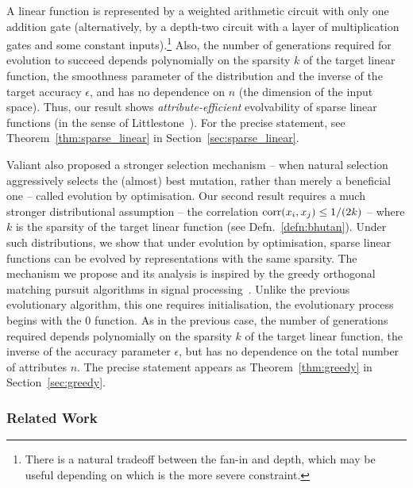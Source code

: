 A linear function is represented by a weighted arithmetic circuit with only one
addition gate (alternatively, by a depth-two circuit with a layer of
multiplication gates and some constant inputs).\footnote{There is a natural
tradeoff between the fan-in and depth, which may be useful depending on which is
the more severe constraint.} Also, the number of generations required for
evolution to succeed depends polynomially on the sparsity $k$ of the target
linear function, the smoothness parameter of the distribution and the inverse of
the target accuracy $\epsilon$, and has no dependence on $n$ (the dimension of
the input space). Thus, our result shows \emph{attribute-efficient} evolvability
of sparse linear functions (in the sense of
Littlestone~\cite{Littlestone:1988}). For the precise statement, see
Theorem~\ref{thm:sparse_linear} in Section~\ref{sec:sparse_linear}.

Valiant also proposed a stronger selection mechanism -- when natural selection
aggressively selects the (almost) best mutation, rather than merely a beneficial
one -- called evolution by optimisation. Our second result requires a much
stronger distributional assumption -- the correlation $\mathrm{corr}(x_i, x_j) \leq
1/(2k)$ -- where $k$ is the sparsity of the target  linear function (see
Defn.~\ref{defn:bhutan}). Under such distributions, we show that under evolution
by optimisation, sparse linear functions can be evolved by representations with
the same sparsity. The mechanism we propose and its analysis is inspired by the
greedy orthogonal matching pursuit algorithms in signal
processing~\cite{Donoho:2006-recovery,Tropp:2004-greed}. Unlike the previous
evolutionary algorithm, this one requires initialisation, \ie the evolutionary
process begins with the $0$ function. As in the previous case, the number of
generations required depends polynomially on the sparsity $k$ of the target
linear function, the inverse of the accuracy parameter $\epsilon$, but has no
dependence on the total number of attributes $n$. The precise statement appears
as Theorem~\ref{thm:greedy} in Section~\ref{sec:greedy}.

\subsubsection*{Related Work}

